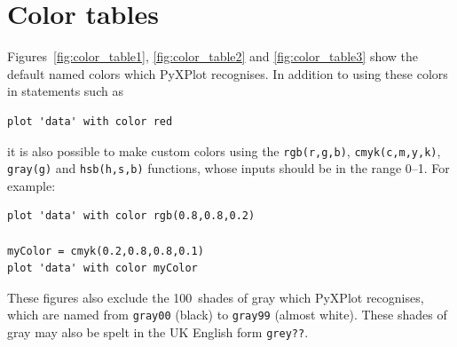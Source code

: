 %
%
%
%
%



\chapter{Color tables}
\label{ch:color_charts}

 Figures~\ref{fig:color_table1}, \ref{fig:color_table2}
and \ref{fig:color_table3} show the default named colors which PyXPlot recognises.
In addition to using these colors in statements such as

\begin{verbatim}
plot 'data' with color red
\end{verbatim}

\noindent it is also possible to make custom colors using the {\tt rgb(r,g,b)},
{\tt cmyk(c,m,y,k)}, {\tt gray(g)} and {\tt hsb(h,s,b)} functions, whose inputs
should be in the range 0--1. For example:

\begin{verbatim}
plot 'data' with color rgb(0.8,0.8,0.2)

myColor = cmyk(0.2,0.8,0.8,0.1)
plot 'data' with color myColor
\end{verbatim}

These figures also exclude the 100~shades of gray which PyXPlot recognises,
which are named from {\tt gray00} (black) to {\tt gray99} (almost white).
These shades of gray may also be spelt in the UK English form {\tt grey??}.

